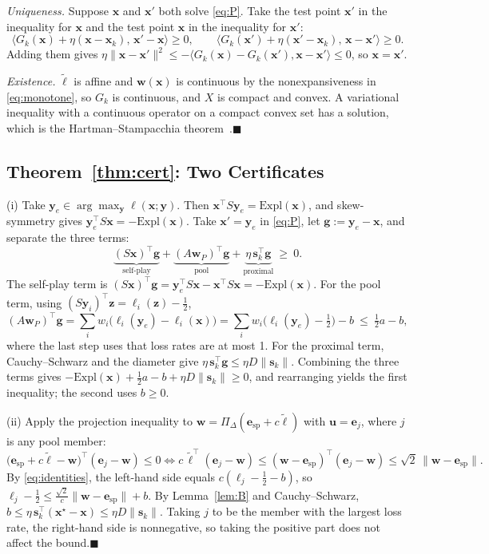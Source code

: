 \documentclass{article} %
\theoremstyle{plain}
\theoremstyle{remark}
\newcommand{\Expl}{\mathrm{Expl}}
\newcommand{\Proj}{\Pi}
\newcommand{\simplex}{\Delta}
\newcommand{\bx}{{\bm{x}}}
\newcommand{\by}{{\bm{y}}}
\newcommand{\bw}{{\bm{w}}}
\newcommand{\bz}{{\bm{z}}}
\newcommand{\bu}{{\bm{u}}}
\newcommand{\bg}{{\bm{g}}}
\newcommand{\be}{{\bm{e}}}
\newcommand{\bell}{{\bm{\ell}}}
\newcommand{\aug}{\tilde{\bell}}
\newcommand{\xs}{\bx^{\star}}
\newcommand{\dx}{{\bm{s}}}
\newcommand{\esp}{\be_{\mathrm{sp}}}
\begin{document}
\textit{Uniqueness.} Suppose $\bx$ and $\bx'$ both solve \eqref{eq:P}. Take the test point $\bx'$ in the inequality for $\bx$ and the test point $\bx$ in the inequality for $\bx'$:
\[
\langle G_k(\bx)+\eta(\bx-\bx_k),\,\bx'-\bx\rangle\ge0,\qquad\langle G_k(\bx')+\eta(\bx'-\bx_k),\,\bx-\bx'\rangle\ge0 .
\]
Adding them gives $\eta\|\bx-\bx'\|^2\le-\langle G_k(\bx)-G_k(\bx'),\bx-\bx'\rangle\le0$, so $\bx=\bx'$.

\textit{Existence.} $\aug$ is affine and $\bw(\bx)$ is continuous by the nonexpansiveness in \eqref{eq:monotone}, so $G_k$ is continuous, and $X$ is compact and convex. A variational inequality with a continuous operator on a compact convex set has a solution, which is the Hartman--Stampacchia theorem~\citep{hartman1966,facchinei2003vi}.\hfill$\blacksquare$

\subsection{Theorem~\ref{thm:cert}: Two Certificates}
\label{app:cert}

(i) Take $\by_e\in\arg\max_\by\ell(\bx;\by)$. Then $\bx^\top S\by_e=\Expl(\bx)$, and skew-symmetry gives $\by_e^\top S\bx=-\Expl(\bx)$. Take $\bx'=\by_e$ in \eqref{eq:P}, let $\bg:=\by_e-\bx$, and separate the three terms:
\[
\underbrace{(S\bx)^\top \bg}_{\text{self-play}}+\underbrace{(A\bw_P)^\top \bg}_{\text{pool}}+\underbrace{\eta\,\dx_k^\top \bg}_{\text{proximal}}\ \ge\ 0 .
\]
The self-play term is $(S\bx)^\top \bg=\by_e^\top S\bx-\bx^\top S\bx=-\Expl(\bx)$. For the pool term, using $(S\by_i)^\top \bz=\ell_i(\bz)-\tfrac12$,
\[
(A\bw_P)^\top \bg=\sum_iw_i\big(\ell_i(\by_e)-\ell_i(\bx)\big)=\sum_iw_i\big(\ell_i(\by_e)-\tfrac12\big)-b\ \le\ \tfrac12a-b ,
\]
where the last step uses that loss rates are at most 1. For the proximal term, Cauchy--Schwarz and the diameter give $\eta\,\dx_k^\top \bg\le\eta D\|\dx_k\|$. Combining the three terms gives $-\Expl(\bx)+\tfrac12a-b+\eta D\|\dx_k\|\ge0$, and rearranging yields the first inequality; the second uses $b\ge0$.

(ii) Apply the projection inequality to $\bw=\Proj_\simplex(\esp+c\aug)$ with $\bu=\be_j$, where $j$ is any pool member:
\[
\big(\esp+c\aug-\bw\big)^\top(\be_j-\bw)\le0\iff c\,\aug^\top(\be_j-\bw)\le(\bw-\esp)^\top(\be_j-\bw)\le\sqrt2\,\|\bw-\esp\| .
\]
By \eqref{eq:identities}, the left-hand side equals $c(\ell_j-\tfrac12-b)$, so $\ell_j-\tfrac12\le\frac{\sqrt2}c\|\bw-\esp\|+b$. By Lemma~\ref{lem:B} and Cauchy--Schwarz, $b\le\eta\,\dx_k^\top(\xs-\bx)\le\eta D\|\dx_k\|$. Taking $j$ to be the member with the largest loss rate, the right-hand side is nonnegative, so taking the positive part does not affect the bound.\hfill$\blacksquare$
\end{document}
